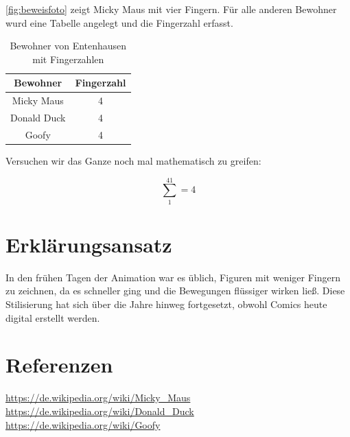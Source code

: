 \documentclass{article}
\begin{document}
\ref{fig:beweisfoto} zeigt Micky Maus mit vier Fingern. Für alle anderen Bewohner wurd eine Tabelle angelegt und die Fingerzahl erfasst.

\begin{table}[h!]
    \centering
    \begin{tabular}{c|c}
        Bewohner & Fingerzahl \\ \hline
        Micky Maus &  4 \\
        Donald Duck & 4 \\
        Goofy & 4 \\
    \end{tabular}
    \caption{Bewohner von Entenhausen mit Fingerzahlen}
    \label{tab:my_label}
\end{table}

Versuchen wir das Ganze noch mal mathematisch zu greifen:

$$
\sum_1^41=4
$$

\section{Erklärungsansatz}

In den frühen Tagen der Animation war es üblich, Figuren mit weniger Fingern zu 
zeichnen, da es schneller ging und die Bewegungen flüssiger wirken ließ. Diese 
Stilisierung hat sich über die Jahre hinweg fortgesetzt, obwohl Comics heute digital 
erstellt werden.

\section{Referenzen}

\begin{thebibliography}{9}
 \url{https://de.wikipedia.org/wiki/Micky_Maus}
 \url{https://de.wikipedia.org/wiki/Donald_Duck}
 \url{https://de.wikipedia.org/wiki/Goofy}
\end{thebibliography}
\end{document}
